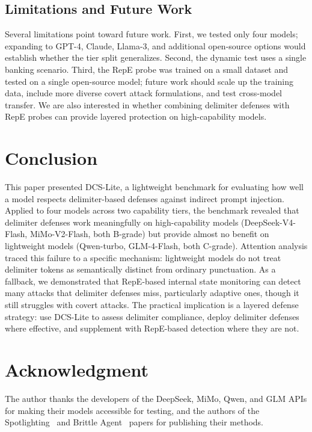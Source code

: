 \documentclass[journal]{IEEEtran}
\begin{document}
\subsection{Limitations and Future Work}

Several limitations point toward future work. First, we tested only four models; expanding to GPT-4, Claude, Llama-3, and additional open-source options would establish whether the tier split generalizes. Second, the dynamic test uses a single banking scenario. Third, the RepE probe was trained on a small dataset and tested on a single open-source model; future work should scale up the training data, include more diverse covert attack formulations, and test cross-model transfer. We are also interested in whether combining delimiter defenses with RepE probes can provide layered protection on high-capability models.

\section{Conclusion}

This paper presented DCS-Lite, a lightweight benchmark for evaluating how well a model respects delimiter-based defenses against indirect prompt injection. Applied to four models across two capability tiers, the benchmark revealed that delimiter defenses work meaningfully on high-capability models (DeepSeek-V4-Flash, MiMo-V2-Flash, both B-grade) but provide almost no benefit on lightweight models (Qwen-turbo, GLM-4-Flash, both C-grade). Attention analysis traced this failure to a specific mechanism: lightweight models do not treat delimiter tokens as semantically distinct from ordinary punctuation. As a fallback, we demonstrated that RepE-based internal state monitoring can detect many attacks that delimiter defenses miss, particularly adaptive ones, though it still struggles with covert attacks. The practical implication is a layered defense strategy: use DCS-Lite to assess delimiter compliance, deploy delimiter defenses where effective, and supplement with RepE-based detection where they are not.

\section*{Acknowledgment}
The author thanks the developers of the DeepSeek, MiMo, Qwen, and GLM APIs for making their models accessible for testing, and the authors of the Spotlighting~\cite{hines2024spotlighting} and Brittle Agent~\cite{zhu2026brittle} papers for publishing their methods.
\end{document}
